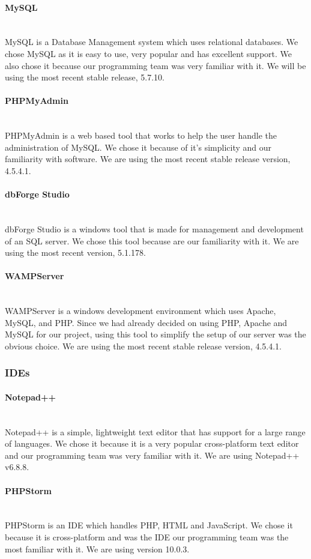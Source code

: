 \documentclass[12pt]{article}
\begin{document}
\paragraph*{MySQL}~\\
MySQL is a Database Management system which uses relational databases. We chose MySQL as it is easy to use, very popular and has excellent support. We also chose it because our programming team was very familiar with it. We will be using the most recent stable release, 5.7.10.
%
\paragraph*{PHPMyAdmin}~\\
PHPMyAdmin is a web based tool that works to help the user handle the administration of MySQL. We chose it because of it's simplicity and our familiarity with software. We are using the most recent stable release version, 4.5.4.1.
%
\paragraph*{dbForge Studio}~\\
dbForge Studio is a windows tool that is made for management and development of an SQL server. We chose this tool because are our familiarity with it. We are using the most recent version, 5.1.178.
%
\paragraph*{WAMPServer}~\\
WAMPServer is a windows development environment which uses Apache, MySQL, and PHP. Since we had already decided on using PHP, Apache and MySQL for our project, using this tool to simplify the setup of our server was the obvious choice. We are using the most recent stable release version, 4.5.4.1.
%
\subsubsection{IDEs}
\paragraph*{Notepad++}~\\
Notepad++ is a simple, lightweight text editor that has support for a large range of languages. We chose it because it is a very popular cross-platform text editor and our programming team was very familiar with it. We are using Notepad++ v6.8.8.
%
\paragraph*{PHPStorm}~\\
PHPStorm is an IDE which handles PHP, HTML and JavaScript. We chose it because it is cross-platform and was the IDE our programming team was the most familiar with it. We are using version 10.0.3.
%
%
%
\end{document}
